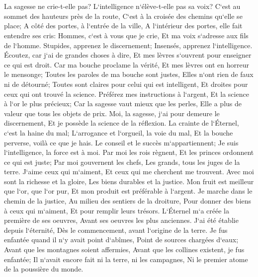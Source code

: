 \chapter{}

\verse La sagesse ne crie-t-elle pas? L`intelligence n`élève-t-elle pas sa voix? 
\verse C`est au sommet des hauteurs près de la route, C`est à la croisée des chemins qu`elle se place; 
\verse A côté des portes, à l`entrée de la ville, A l`intérieur des portes, elle fait entendre ses cris: 
\verse Hommes, c`est à vous que je crie, Et ma voix s`adresse aux fils de l`homme. 
\verse Stupides, apprenez le discernement; Insensés, apprenez l`intelligence. 
\verse Écoutez, car j`ai de grandes choses à dire, Et mes lèvres s`ouvrent pour enseigner ce qui est droit. 
\verse Car ma bouche proclame la vérité, Et mes lèvres ont en horreur le mensonge; 
\verse Toutes les paroles de ma bouche sont justes, Elles n`ont rien de faux ni de détourné; 
\verse Toutes sont claires pour celui qui est intelligent, Et droites pour ceux qui ont trouvé la science. 
\verse Préférez mes instructions à l`argent, Et la science à l`or le plus précieux; 
\verse Car la sagesse vaut mieux que les perles, Elle a plus de valeur que tous les objets de prix. 
\verse Moi, la sagesse, j`ai pour demeure le discernement, Et je possède la science de la réflexion. 
\verse La crainte de l`Éternel, c`est la haine du mal; L`arrogance et l`orgueil, la voie du mal, Et la bouche perverse, voilà ce que je hais. 
\verse Le conseil et le succès m`appartiennent; Je suis l`intelligence, la force est à moi. 
\verse Par moi les rois règnent, Et les princes ordonnent ce qui est juste; 
\verse Par moi gouvernent les chefs, Les grands, tous les juges de la terre. 
\verse J`aime ceux qui m`aiment, Et ceux qui me cherchent me trouvent. 
\verse Avec moi sont la richesse et la gloire, Les biens durables et la justice. 
\verse Mon fruit est meilleur que l`or, que l`or pur, Et mon produit est préférable à l`argent. 
\verse Je marche dans le chemin de la justice, Au milieu des sentiers de la droiture, 
\verse Pour donner des biens à ceux qui m`aiment, Et pour remplir leurs trésors. 
\verse L`Éternel m`a créée la première de ses oeuvres, Avant ses oeuvres les plus anciennes. 
\verse J`ai été établie depuis l`éternité, Dès le commencement, avant l`origine de la terre. 
\verse Je fus enfantée quand il n`y avait point d`abîmes, Point de sources chargées d`eaux; 
\verse Avant que les montagnes soient affermies, Avant que les collines existent, je fus enfantée; 
\verse Il n`avait encore fait ni la terre, ni les campagnes, Ni le premier atome de la poussière du monde. 
